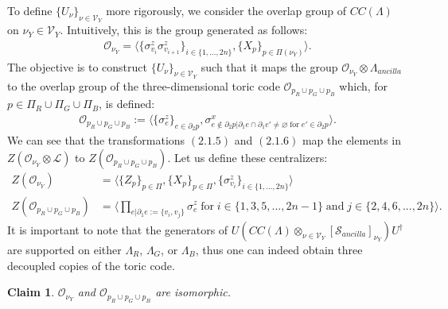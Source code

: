 \documentclass[12pt]{article}
\let\emptyset\varnothing
\newtheorem{claim}[theorem]{Claim}
\theoremstyle{definition}
\begin{document}
To define $\{U_\nu\}_{\nu\in\mathcal{V}_Y}$ more rigorously, we consider the overlap group of $CC(\Lambda)$ on $\nu_Y\in\mathcal{V}_Y$. Intuitively, this is the group generated as follows:
    \begin{align}
        \mathcal{O}_{\nu_Y} = \langle\{\sigma^z_{v_i}\sigma^z_{v_{i+1}}\}_{i\in\{1,...,2n\}}, \{X_p\}_{p\in\Pi(\nu_Y)}\rangle.
    \end{align}
The objective is to construct $\{U_\nu\}_{\nu\in\mathcal{V}_Y}$ such that it maps the group $\mathcal{O}_{\nu_Y}\otimes\Lambda_{ancilla}$ to the overlap group of the three-dimensional toric code $\mathcal{O}_{p_R\cup p_G\cup p_B}$ which, for $p\in \Pi_R\cup \Pi_G\cup \Pi_B$, is defined:
    \begin{align}
        \mathcal{O}_{p_R\cup p_G\cup p_B} := \langle\{\sigma^z_e\}_{e\in\partial_2p},\sigma^x_{e\notin\partial_2p|\partial_1e\cap\partial_1e'\neq\emptyset\;\text{for}\; e'\in\partial_2p}\rangle .
    \end{align}
We can see that the transformations $(2.1.5)$ and $(2.1.6)$ map the elements in $Z(\mathcal{O}_{\nu_Y}\otimes\mathcal{L})$ to $Z(\mathcal{O}_{p_R\cup p_G\cup p_B})$. Let us define these centralizers:
    \begin{align}
        Z(\mathcal{O}_{\nu_Y}) &= \langle\{Z_p\}_{p\in\Pi},\{X_p\}_{p\in\Pi},\{\sigma^z_{v_i}\}_{i\in\{1,...,2n\}}\rangle\\
        Z(\mathcal{O}_{p_R\cup p_G\cup p_B}) &= \langle\prod_{e|\partial_1e := \{v_i,v_j\}}\sigma^z_e\;\text{for}\;i\in\{1,3,5,...,2n-1\}\;\text{and}\;j\in\{2,4,6,...,2n\}\rangle .
    \end{align}
It is important to note that the generators of $U(CC(\Lambda)\otimes_{\nu\in\mathcal{V}_Y}[\mathcal{S}_{ancilla}]_{\nu_Y})U^\dagger$ are supported on either $\Lambda_R$, $\Lambda_G$, or $\Lambda_B$, thus one can indeed obtain three decoupled copies of the toric code.
    \begin{claim}
        $\mathcal{O}_{\nu_Y}$ and $\mathcal{O}_{p_R\cup p_G\cup p_B}$ are isomorphic.
    \end{claim}
\end{document}

